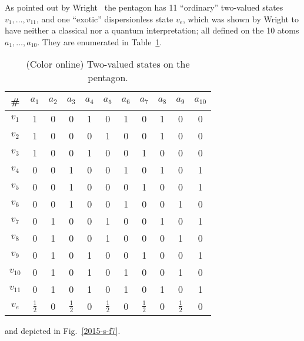 As pointed out by Wright~\cite[p~268]{wright:pent} the pentagon has 11 ``ordinary'' two-valued states $v_1,\ldots ,v_{11}$,
and one ``exotic'' dispersionless state $v_e$,
which was shown by Wright to have neither a classical nor a quantum interpretation;
all defined on the 10 atoms $a_1, \ldots , a_{10}$.
They are enumerated in Table~\ref{2017-b-t-sotp}.
 \begin{table}%
 \begin{center}
 \caption{\label{2017-b-t-sotp} (Color online) Two-valued states on the pentagon.}
 \begin{tabular}{ccccccccccc}
\hline\hline
\#
&
$a_1$&
$a_2$&
$a_3$&
$a_4$&
$a_5$&
$a_6$&
$a_7$&
$a_8$&
$a_9$&
$a_{10}$
\\
\hline
$v_1$&1&  0&  0& 1&  0& 1&  0& 1&  0&  0 \\
$v_2$&1&  0&  0&  0& 1&  0&  0& 1&  0&  0\\
$v_3$&1&  0&  0& 1&  0&  0& 1&  0&  0&  0\\
$v_4$&0&  0& 1&  0&  0& 1&  0& 1&  0& 1\\
$v_5$&0&  0& 1&  0&  0&  0& 1&  0&  0& 1\\
$v_6$&0&  0& 1&  0&  0& 1&  0&  0& 1&  0\\
$v_7$&0& 1&  0&  0& 1&  0&  0& 1&  0& 1\\
$v_8$&0& 1&  0&  0& 1&  0&  0&  0& 1&  0\\
$v_9$&0& 1&  0& 1&  0&  0& 1&  0&  0& 1\\
$v_{10}$&0& 1&  0& 1&  0& 1&  0&  0& 1&  0\\
$v_{11}$&0& 1&  0& 1&  0& 1&  0& 1&  0& 1 \\
\hline
$v_e$&$\frac{1}{2}$& 0&  $\frac{1}{2}$& 0&  $\frac{1}{2}$& 0&  $\frac{1}{2}$& 0&  $\frac{1}{2}$& 0   \\
\hline\hline
 \end{tabular}
 \end{center}
 \end{table}
and depicted in Fig.~\ref{2015-s-f7}.


